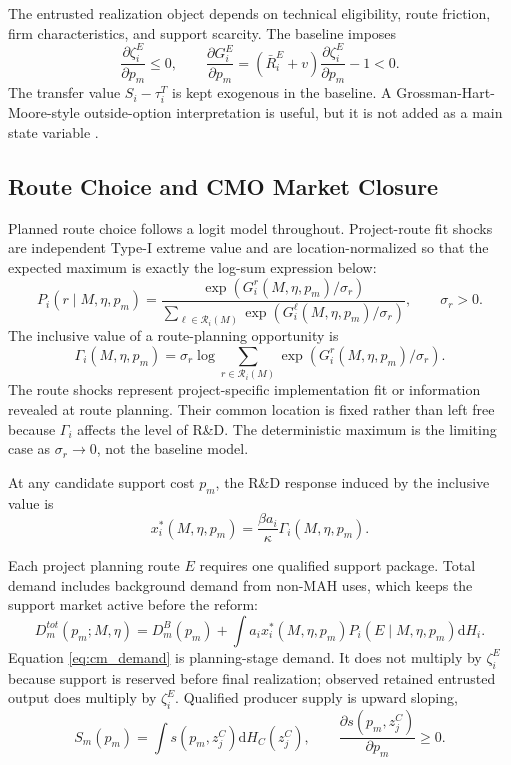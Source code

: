 \documentclass[12pt]{article}
\newcommand{\1}{\mathbf{1}}
\newcommand{\dd}{\mathrm{d}}
\newcommand{\calR}{\mathcal{R}}
\begin{document}
The entrusted realization object depends on technical eligibility, route friction, firm characteristics, and support scarcity. The baseline imposes
\[
    \frac{\partial\zeta_i^E}{\partial p_m}\le0,
    \qquad
    \frac{\partial G_i^E}{\partial p_m}
    =(\bar R_i^E+v)\frac{\partial\zeta_i^E}{\partial p_m}-1<0.
\]
The transfer value $S_i-\tau_i^T$ is kept exogenous in the baseline. A Grossman-Hart-Moore-style outside-option interpretation is useful, but it is not added as a main state variable \citep{GrossmanHart1986,HartMoore1990}.

\subsection{Route Choice and CMO Market Closure}

Planned route choice follows a logit model throughout. Project-route fit shocks are independent Type-I extreme value and are location-normalized so that the expected maximum is exactly the log-sum expression below:
\begin{equation}
    P_i(r\mid M,\eta,p_m)
    =
    \frac{\exp(G_i^r(M,\eta,p_m)/\sigma_r)}
    {\sum_{\ell\in\calR_i(M)}\exp(G_i^\ell(M,\eta,p_m)/\sigma_r)},
    \qquad \sigma_r>0.
    \label{eq:logit_prob}
\end{equation}
The inclusive value of a route-planning opportunity is
\begin{equation}
    \Gamma_i(M,\eta,p_m)
    =
    \sigma_r\log
    \sum_{r\in\calR_i(M)}
    \exp(G_i^r(M,\eta,p_m)/\sigma_r).
    \label{eq:Gamma}
\end{equation}
The route shocks represent project-specific implementation fit or information revealed at route planning. Their common location is fixed rather than left free because $\Gamma_i$ affects the level of R\&D. The deterministic maximum is the limiting case as $\sigma_r\rightarrow0$, not the baseline model.

At any candidate support cost $p_m$, the R\&D response induced by the inclusive value is
\begin{equation}
    x_i^*(M,\eta,p_m)=\frac{\beta a_i}{\kappa}\Gamma_i(M,\eta,p_m).
    \label{eq:xstar_offeq}
\end{equation}

Each project planning route $E$ requires one qualified support package. Total demand includes background demand from non-MAH uses, which keeps the support market active before the reform:
\begin{equation}
    D_m^{tot}(p_m;M,\eta)
    =
    D_m^B(p_m)
    +\int
    a_i x_i^*(M,\eta,p_m)
    P_i(E\mid M,\eta,p_m)
    \dd H_i .
    \label{eq:cm_demand}
\end{equation}
Equation \eqref{eq:cm_demand} is planning-stage demand. It does not multiply by $\zeta_i^E$ because support is reserved before final realization; observed retained entrusted output does multiply by $\zeta_i^E$.
Qualified producer supply is upward sloping,
\begin{equation}
    S_m(p_m)=\int s(p_m,z_j^C)\dd H_C(z_j^C),
    \qquad
    \frac{\partial s(p_m,z_j^C)}{\partial p_m}\ge0.
    \label{eq:cm_supply}
\end{equation}
\end{document}
